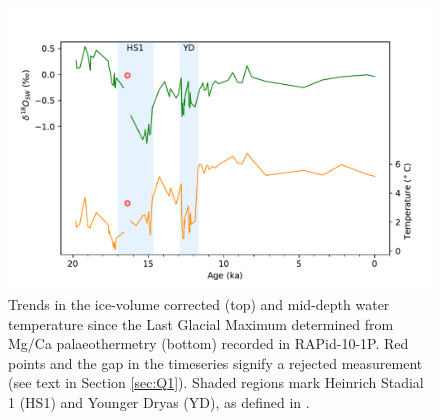 \begin{figure} \label{eq:timeseries}
\includegraphics[width=\textwidth]{img/timeseries_temp_and_d18Osw.pdf}
    \caption{Trends in the ice-volume corrected  (top) and mid-depth water temperature since the Last Glacial Maximum determined from Mg/Ca palaeothermetry (bottom) recorded in RAPid-10-1P.
             Red points and the gap in the timeseries signify a rejected measurement (see text in Section \ref{sec:Q1}).
             Shaded regions mark Heinrich Stadial 1 (HS1) and Younger Dryas (YD), as defined in \citeauthor{thornalley2011reconstructing} \parencite{thornalley2011reconstructing}.}
        \label{fig:timeseriestempd18Osw}
\end{figure}

